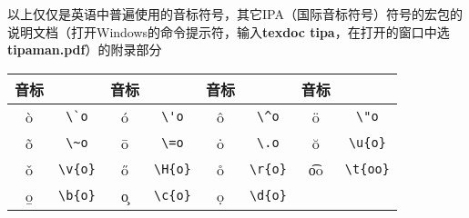 以上仅仅是英语中普遍使用的音标符号，其它IPA（国际音标符号）符号的  宏包的说明文档（打开Windows的命令提示符，输入{\bfseries\times  texdoc  tipa}，在打开的窗口中选\textbf{\times  tipaman.pdf}）的附录部分

\begin{table}[H]
\centering
\yinbiao
\begin{tabular}{|*{8}{c|}}\hline
音标  &    &音标  &    &音标  &  &音标  &    \\
\hline
\`o  &  \verb|\`o|  &
\'o  &  \verb|\'o|  &
\^o  &  \verb|\^o|  &
\"o  &  \verb|\"o|  \\\hline
\~o  &  \verb|\~o|  &
\=o  &  \verb|\=o|  &
\.o  &  \verb|\.o|  &
\u{o}  &  \verb|\u{o}|  \\\hline
\v{o}  &  \verb|\v{o}|  &
\H{o}  &  \verb|\H{o}|  &
\r{o}  &  \verb|\r{o}|  &
\t{oo}  &  \verb|\t{oo}|  \\\hline
\b{o}  &  \verb|\b{o}|  &
\c{o}  &  \verb|\c{o}|  &
\d{o}  &  \verb|\d{o}|  &
&  \\\hline
\end{tabular}

\end{table}
